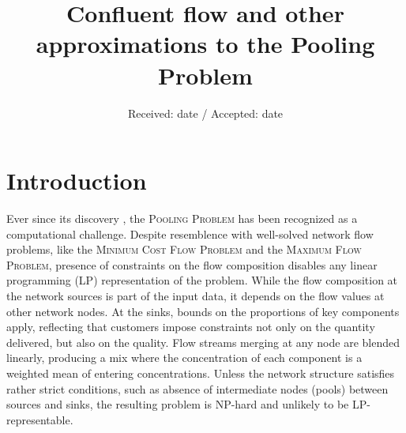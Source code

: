 \documentclass[pdflatex,sn-mathphys-num]{sn-jnl}%
\theoremstyle{thmstyleone}%
\begin{document}
\title[Confluent flow and other approximations to the Pooling Problem]{Confluent flow and other approximations to the Pooling Problem}

\author*[1]{ }
\author[2]{ }
\author[3]{ }

\date{Received: date / Accepted: date}

\maketitle



\section{Introduction}
\label{intro}

Ever since its discovery \cite{haverly78}, the \textsc{Pooling Problem} has been recognized as a computational challenge.
Despite resemblence with well-solved network flow problems, like the \textsc{Minimum Cost Flow Problem} and the \textsc{Maximum Flow Problem},
presence of constraints on the flow composition disables any linear programming (LP) representation of the problem.
While the flow composition at the network sources is part of the input data, it depends on the flow values at other network nodes.
At the sinks, bounds on the proportions of key components apply,
reflecting that customers impose constraints not only on the quantity delivered, but also on the quality.
Flow streams merging at any node are blended linearly,
producing a mix where the concentration of each component is a weighted mean of entering concentrations.
Unless the network structure satisfies rather strict conditions, such as absence of intermediate nodes (pools) between sources and sinks,
the resulting problem is NP-hard and unlikely to be LP-representable.
\end{document}
